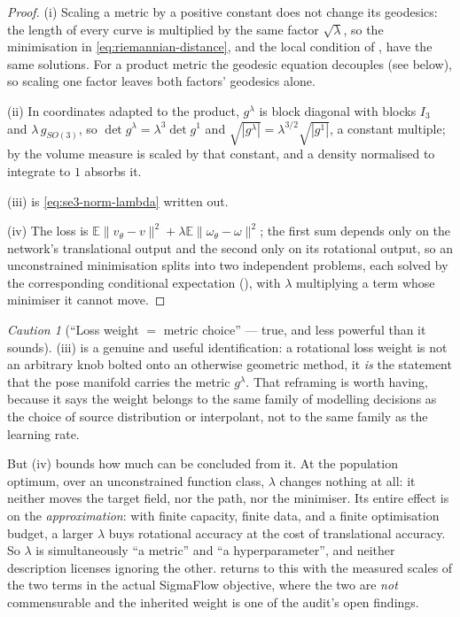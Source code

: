 \documentclass[11pt,a4paper]{report}
\theoremstyle{definition}
\theoremstyle{remark}
\newtheorem{caution}[caution]{Caution}
\newcommand{\EE}{\mathbb E}
\begin{document}
\begin{proof}
(i) Scaling a metric by a positive constant does not change its geodesics:
the length of every curve is multiplied by the same factor
$\sqrt\lambda$, so the minimisation in \eqref{eq:riemannian-distance}, and
the local condition of , have the same solutions.
For a product metric the geodesic equation decouples (see
 below), so scaling one factor leaves both factors'
geodesics alone.

(ii) In coordinates adapted to the product, $g^\lambda$ is block diagonal
with blocks $I_3$ and $\lambda\,g_{SO(3)}$, so
$\det g^\lambda=\lambda^3\det g^1$ and
$\sqrt{|g^\lambda|}=\lambda^{3/2}\sqrt{|g^1|}$, a constant multiple; by
 the volume measure is scaled by that constant,
and a density normalised to integrate to $1$ absorbs it.

(iii) is \eqref{eq:se3-norm-lambda} written out.

(iv) The loss is $\EE\|v_\theta-v\|^2+\lambda\EE\|\omega_\theta-\omega\|^2$;
the first sum depends only on the network's translational output and the
second only on its rotational output, so an unconstrained minimisation
splits into two independent problems, each solved by the corresponding
conditional expectation (), with $\lambda$
multiplying a term whose minimiser it cannot move.
\end{proof}

\begin{caution}[``Loss weight $=$ metric choice'' --- true, and less powerful than it sounds]
\label{caution:lambda-interpretation}
(iii) is a genuine and useful identification: a
rotational loss weight is not an arbitrary knob bolted onto an otherwise
geometric method, it \emph{is} the statement that the pose manifold carries
the metric $g^\lambda$. That reframing is worth having, because it says the
weight belongs to the same family of modelling decisions as the choice of
source distribution or interpolant, not to the same family as the learning
rate.

But (iv) bounds how much can be concluded from it.
At the population optimum, over an unconstrained function class, $\lambda$
changes nothing at all: it neither moves the target field, nor the path, nor
the minimiser. Its entire effect is on the \emph{approximation}: with finite
capacity, finite data, and a finite optimisation budget, a larger $\lambda$
buys rotational accuracy at the cost of translational accuracy. So
$\lambda$ is simultaneously ``a metric'' and ``a hyperparameter'', and
neither description licenses ignoring the other. 
returns to this with the measured scales of the two terms in the actual
SigmaFlow objective, where the two are \emph{not} commensurable and the
inherited weight is one of the audit's open findings.
\end{caution}
\end{document}
